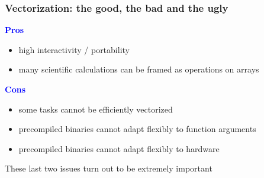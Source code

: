 \documentclass[
    xcolor={svgnames,dvipsnames},
    hyperref={colorlinks, citecolor=DeepPink4, linkcolor=DarkRed, urlcolor=DarkBlue}
    ]{beamer}  %
\newcommand{\navy}[1]{\textcolor{Blue}{\bf #1}}
\newcommand{\1}{\mathbbm 1}
\begin{document}
\begin{frame}

    \begin{figure}
       \begin{center} %
       \end{center}
    \end{figure}


\end{frame}


\begin{frame}
    \frametitle{Vectorization: the good, the bad and the ugly}

    \navy{Pros}

    \begin{itemize}
        \item high interactivity / portability 
        \vspace{0.2em}
        \item many scientific calculations can be framed as operations on arrays
    \end{itemize}

    \vspace{0.5em}

    \navy{Cons}

    \begin{itemize}
        \item some tasks cannot be efficiently vectorized
        \vspace{0.2em}
        \item precompiled binaries cannot adapt flexibly to function arguments
        \vspace{0.2em}
        \item precompiled binaries cannot adapt flexibly to hardware
    \end{itemize}

    These last two issues turn out to be extremely important

\end{frame}
\end{document}
